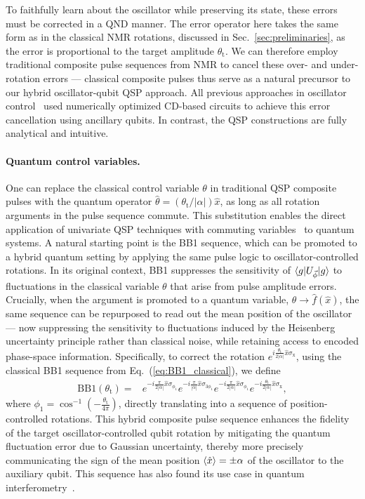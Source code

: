 \documentclass[aps,prx,showpacs,notitlepage,twocolumn,superscriptaddress,nofootinbib,preprintnumbers,floatfix,10pt, longbibliography]{revtex4-2}
\begin{document}
To faithfully learn about the oscillator while preserving its state, these errors must be corrected 
in a QND manner. The error operator here takes the same form as in the classical NMR rotations, discussed in 
Sec.~\ref{sec:preliminaries}, as the error is proportional to the target amplitude $\theta_\mathrm{t}$. 
We can therefore employ traditional composite pulse sequences from NMR to cancel these over- and 
under-rotation errors --- classical composite pulses thus serve as a natural precursor to our hybrid 
oscillator-qubit QSP approach. All previous 
approaches in oscillator control~\cite{eickbusch2022fast,hastrup2021improved,hastrup2021measurement,hastrup2021unconditional} 
used numerically optimized CD-based circuits to achieve this error cancellation using 
ancillary qubits. In contrast, the QSP constructions are fully analytical and intuitive.

\paragraph{Quantum control variables.}
One can replace the classical control variable $\theta$ in traditional QSP composite pulses with the quantum operator $\hat{\theta} = (\theta_\mathrm{t}/|\alpha|)\hat{x}$, as long as all rotation arguments in the pulse sequence commute. This substitution enables the direct application of univariate QSP techniques with commuting variables~\cite{low2016methodology,low2017quantum} to quantum systems. A natural starting point is the BB1 sequence, which can be promoted to a hybrid quantum setting by applying the same pulse logic to oscillator-controlled rotations. In its original context, BB1 suppresses the sensitivity of $\braket{g|U_{\vec{\phi}}|g}$ to fluctuations in the classical variable $\theta$ that arise from pulse amplitude errors. Crucially, when the argument is promoted to a quantum variable, $\theta\rightarrow\hat f(\hat x)$, the same sequence can be repurposed to read out the mean position of the oscillator --- now suppressing the sensitivity to fluctuations induced by the Heisenberg uncertainty principle rather than classical noise, while retaining access to encoded phase-space information. Specifically, to correct the rotation $e^{i\frac{\theta_\mathrm{t}}{2|\alpha|}\hat x\sigma_\mathrm{x}}$, using the classical BB1 sequence from Eq.~(\ref{eq:BB1_classical}), we define
\begin{align}
\mathrm{BB1}(\theta_\mathrm{t}) ={}&e^{-i\frac{\pi}{2|\alpha|}\hat x\sigma_{\phi_1}}e^{-i\frac{\pi}{|\alpha|}\hat x\sigma_{3\phi_1}}e^{-i\frac{\pi}{2|\alpha|}\hat x\sigma_{\phi_1}}e^{-i\frac{\theta_\mathrm{t}}{2|\alpha|}\hat x\sigma_\mathrm{x}},\label{eq:BB1}
\end{align}
where $\phi_1 = \cos^{-1}\left(-\frac{\theta_\mathrm{t}}{4\pi}\right)$, directly translating into a sequence of position-controlled rotations. This hybrid composite pulse sequence enhances the fidelity of the target oscillator-controlled qubit rotation by mitigating the quantum fluctuation error due to Gaussian uncertainty, thereby more precisely communicating the sign of the mean position $\braket{\hat x}=\pm \alpha$ of the oscillator to the auxiliary qubit. This sequence has also found its use case in quantum interferometry~\cite{sinanan2023single}.
\end{document}
